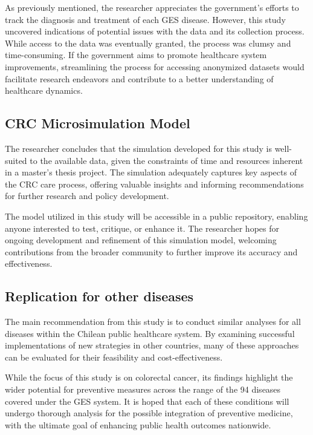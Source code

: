 As previously mentioned, the researcher appreciates the government's efforts to track the diagnosis and treatment of each GES disease. However, this study uncovered indications of potential issues with the data and its collection process. While access to the data was eventually granted, the process was clumsy and time-consuming. If the government aims to promote healthcare system improvements, streamlining the process for accessing anonymized datasets would facilitate research endeavors and contribute to a better understanding of healthcare dynamics.

\subsection*{CRC Microsimulation Model}

The researcher concludes that the simulation developed for this study is well-suited to the available data, given the constraints of time and resources inherent in a master's thesis project. The simulation adequately captures key aspects of the CRC care process, offering valuable insights and informing recommendations for further research and policy development.

The model utilized in this study will be accessible in a public repository, enabling anyone interested to test, critique, or enhance it. The researcher hopes for ongoing development and refinement of this simulation model, welcoming contributions from the broader community to further improve its accuracy and effectiveness.

\subsection*{Replication for other diseases}

The main recommendation from this study is to conduct similar analyses for all diseases within the Chilean public healthcare system. By examining successful implementations of new strategies in other countries, many of these approaches can be evaluated for their feasibility and cost-effectiveness.

While the focus of this study is on colorectal cancer, its findings highlight the wider potential for preventive measures across the range of the 94 diseases covered under the GES system. It is hoped that each of these conditions will undergo thorough analysis for the possible integration of preventive medicine, with the ultimate goal of enhancing public health outcomes nationwide.

